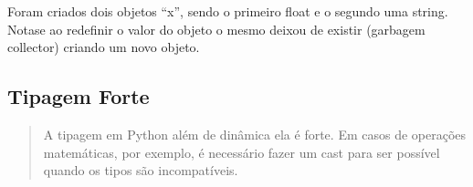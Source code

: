 \documentclass[letterpaper,10pt,brazil]{sphinxmanual}
\begin{document}
\begin{sphinxVerbatim}[commandchars=\\\{\}]
\end{sphinxVerbatim}

\begin{sphinxVerbatim}[commandchars=\\\{\}]
\end{sphinxVerbatim}

\begin{sphinxVerbatim}[commandchars=\\\{\}]
  

\end{sphinxVerbatim}

\begin{sphinxVerbatim}[commandchars=\\\{\}]
\end{sphinxVerbatim}

\begin{sphinxVerbatim}[commandchars=\\\{\}]
\end{sphinxVerbatim}

\begin{sphinxVerbatim}[commandchars=\\\{\}]
\end{sphinxVerbatim}

Foram criados dois objetos “x”, sendo o primeiro float e o segundo uma string.
Nota\sphinxhyphen{}se ao redefinir o valor do objeto o mesmo deixou de existir (garbagem collector) criando um novo objeto.


\subsection{Tipagem Forte}
\label{\detokenize{content/data_types:tipagem-forte}}\begin{quote}

A tipagem em Python além de dinâmica ela é forte.
Em casos de operações matemáticas, por exemplo, é necessário fazer um cast para ser possível quando os tipos são incompatíveis.
\end{quote}
\end{document}
